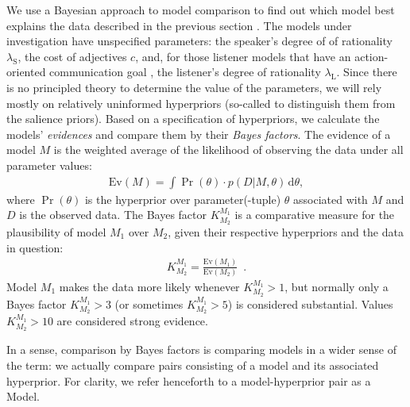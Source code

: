 We use a Bayesian approach to model comparison to find out which model
best explains the data described in the previous section
\cite{VandekerckhoveMatzke2013:Model-Compariso}. The models under
investigation have unspecified parameters: the speaker's degree of of
rationality $\lambda_\mathrm{S}$, the cost of adjectives $c$, and, for
those listener models that have an action-oriented communication goal
, the listener's degree of rationality $\lambda_\mathrm{L}$. Since
there is no principled theory to determine the value of the
parameters, we will rely mostly on relatively uninformed hyperpriors
(so-called to distinguish them from the salience priors). Based on a
specification of hyperpriors, we calculate the models' \emph{evidences}
and compare them by their \emph{Bayes factors}. The evidence of a
model $M$ is the weighted average of the likelihood of observing the
data under all parameter values:
\begin{align}
  \label{BMA}
  \mathrm{Ev}(M)= \int \Pr(\theta) \cdot p(D | M, \theta)\, \mathrm{d}\theta,
\end{align}
where $\Pr(\theta)$ is the hyperprior over parameter(-tuple) $\theta$
associated with $M$ and $D$ is the observed data. The Bayes factor
$K^{M_1}_{M_2}$ is a comparative measure for the plausibility of model
$M_1$ over $M_2$, given their respective hyperpriors and the data in
question:
\begin{align}
  K^{M_1}_{M_2} = \frac{\mathrm{Ev}(M_1)}{\mathrm{Ev}(M_2)} \enspace .
\end{align}
Model $M_1$ makes the data more likely whenever $K^{M_1}_{M_2} > 1$, but
normally only a Bayes factor $K^{M_1}_{M_2} >3$ (or sometimes
$K^{M_1}_{M_2} > 5$) is considered substantial. Values $K^{M_1}_{M_2}
> 10$ are considered strong evidence.

In a sense, comparison by Bayes factors is comparing models in a wider
sense of the term: we actually compare pairs consisting of a model and
its associated hyperprior. For clarity, we refer henceforth to a
model-hyperprior pair as a Model.

